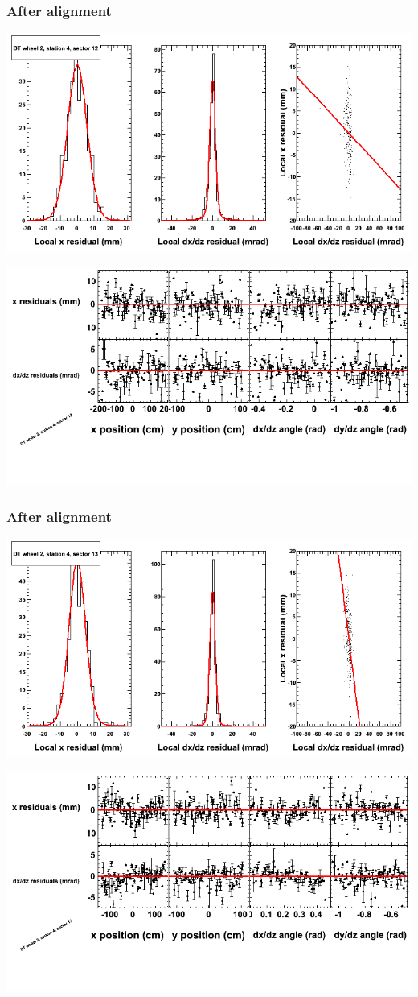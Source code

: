 \documentclass[compress]{beamer}
\begin{document}
\begin{frame}
\frametitle{After alignment}
\includegraphics[width=0.7\linewidth]{NOV4_fitfunctions/MBwhEst4sec12_bellcurves.png}

\includegraphics[width=0.7\linewidth]{NOV4_fitfunctions/MBwhEst4sec12_polynomials.png}
\end{frame}

\begin{frame}
\frametitle{After alignment}
\includegraphics[width=0.7\linewidth]{NOV4_fitfunctions/MBwhEst4sec13_bellcurves.png}

\includegraphics[width=0.7\linewidth]{NOV4_fitfunctions/MBwhEst4sec13_polynomials.png}
\end{frame}
\end{document}
